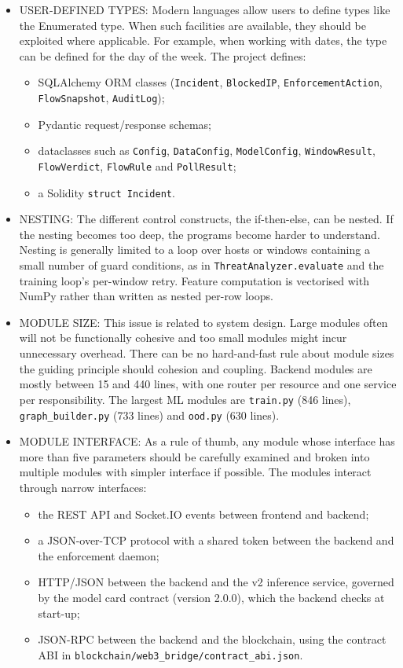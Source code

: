 \documentclass[12pt,a4paper]{report}
\begin{document}
\begin{itemize}
  \item   USER-DEFINED TYPES:
Modern languages allow users to define types like the Enumerated type. When such facilities are available, they should be exploited where applicable. For example, when working with dates, the type can be defined for the day of the week. The project defines:
\begin{itemize}
    \item SQLAlchemy ORM classes (\texttt{Incident}, \texttt{BlockedIP}, \texttt{EnforcementAction}, \texttt{FlowSnapshot}, \texttt{AuditLog});
    \item Pydantic request/response schemas;
    \item dataclasses such as \texttt{Config}, \texttt{DataConfig}, \texttt{ModelConfig}, \texttt{WindowResult}, \texttt{FlowVerdict}, \texttt{FlowRule} and \texttt{PollResult};
    \item a Solidity \texttt{struct Incident}.
\end{itemize}

 \item    NESTING:
The different control constructs, the if-then-else, can be nested. If the nesting becomes too deep, the programs become harder to understand. Nesting is generally limited to a loop over hosts or windows containing a small number of guard conditions, as in \texttt{ThreatAnalyzer.evaluate} and the training loop's per-window retry. Feature computation is vectorised with NumPy rather than written as nested per-row loops.

  \item   MODULE SIZE:
This issue is related to system design. Large modules often will not be functionally cohesive and too small modules might incur unnecessary overhead. There can be no hard-and-fast rule about module sizes the guiding principle should cohesion and coupling. Backend modules are mostly between 15 and 440 lines, with one router per resource and one service per responsibility. The largest ML modules are \texttt{train.py} (846 lines), \texttt{graph\_builder.py} (733 lines) and \texttt{ood.py} (630 lines).

\item  MODULE INTERFACE:
 As a rule of thumb, any module whose interface has more than five parameters should be carefully examined and broken into multiple modules with simpler interface if possible. The modules interact through narrow interfaces:
 \begin{itemize}
     \item the REST API and Socket.IO events between frontend and backend;
     \item a JSON-over-TCP protocol with a shared token between the backend and the enforcement daemon;
     \item HTTP/JSON between the backend and the v2 inference service, governed by the model card contract (version 2.0.0), which the backend checks at start-up;
     \item JSON-RPC between the backend and the blockchain, using the contract ABI in \texttt{blockchain/web3\_bridge/contract\_abi.json}.
 \end{itemize}


\end{itemize}
\end{document}
